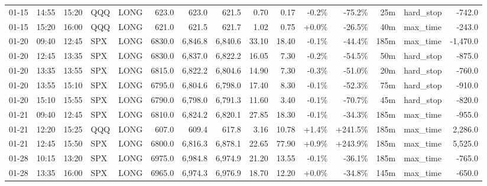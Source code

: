 \documentclass[11pt,a4paper,twoside]{article}
\begin{document}
\begin{landscape}
\begin{center}
\begin{longtable}{>{\color{txtmain}}l l l l l r r r r r r r r >{\color{txtmain}}l r}
01-15 & 14:55 & 15:20 & QQQ & LONG & 623.0 & 623.0 & 621.5 & 0.70 & 0.17 & \textcolor{lossred}{-0.2\%} & \textcolor{lossred}{-75.2\%} & 25m & hard\_stop & \textcolor{lossred}{-742.0} \\
01-15 & 15:20 & 16:00 & QQQ & LONG & 621.0 & 621.5 & 621.7 & 1.02 & 0.75 & \textcolor{wingreen}{+0.0\%} & \textcolor{lossred}{-26.5\%} & 40m & max\_time & \textcolor{lossred}{-243.0} \\
01-20 & 09:40 & 12:45 & SPX & LONG & 6830.0 & 6,846.8 & 6,840.6 & 33.10 & 18.40 & \textcolor{lossred}{-0.1\%} & \textcolor{lossred}{-44.4\%} & 185m & max\_time & \textcolor{lossred}{-1,470.0} \\
01-20 & 12:45 & 13:35 & SPX & LONG & 6830.0 & 6,837.0 & 6,822.2 & 16.05 & 7.30 & \textcolor{lossred}{-0.2\%} & \textcolor{lossred}{-54.5\%} & 50m & hard\_stop & \textcolor{lossred}{-875.0} \\
01-20 & 13:35 & 13:55 & SPX & LONG & 6815.0 & 6,822.2 & 6,804.6 & 14.90 & 7.30 & \textcolor{lossred}{-0.3\%} & \textcolor{lossred}{-51.0\%} & 20m & hard\_stop & \textcolor{lossred}{-760.0} \\
01-20 & 13:55 & 15:10 & SPX & LONG & 6795.0 & 6,804.6 & 6,798.0 & 17.40 & 8.30 & \textcolor{lossred}{-0.1\%} & \textcolor{lossred}{-52.3\%} & 75m & hard\_stop & \textcolor{lossred}{-910.0} \\
01-20 & 15:10 & 15:55 & SPX & LONG & 6790.0 & 6,798.0 & 6,791.3 & 11.60 & 3.40 & \textcolor{lossred}{-0.1\%} & \textcolor{lossred}{-70.7\%} & 45m & hard\_stop & \textcolor{lossred}{-820.0} \\
01-21 & 09:40 & 12:45 & SPX & LONG & 6810.0 & 6,824.2 & 6,820.1 & 27.85 & 18.30 & \textcolor{lossred}{-0.1\%} & \textcolor{lossred}{-34.3\%} & 185m & max\_time & \textcolor{lossred}{-955.0} \\
01-21 & 12:20 & 15:25 & QQQ & LONG & 607.0 & 609.4 & 617.8 & 3.16 & 10.78 & \textcolor{wingreen}{+1.4\%} & \textcolor{wingreen}{+241.5\%} & 185m & max\_time & \textcolor{wingreen}{2,286.0} \\
01-21 & 12:45 & 15:50 & SPX & LONG & 6800.0 & 6,816.3 & 6,878.1 & 22.65 & 77.90 & \textcolor{wingreen}{+0.9\%} & \textcolor{wingreen}{+243.9\%} & 185m & max\_time & \textcolor{wingreen}{5,525.0} \\
01-28 & 10:15 & 13:20 & SPX & LONG & 6975.0 & 6,984.8 & 6,974.9 & 21.20 & 13.55 & \textcolor{lossred}{-0.1\%} & \textcolor{lossred}{-36.1\%} & 185m & max\_time & \textcolor{lossred}{-765.0} \\
01-28 & 13:35 & 16:00 & SPX & LONG & 6965.0 & 6,974.3 & 6,976.9 & 18.70 & 12.20 & \textcolor{wingreen}{+0.0\%} & \textcolor{lossred}{-34.8\%} & 145m & max\_time & \textcolor{lossred}{-650.0} \\

\end{longtable}
\end{center}
\end{landscape}
\end{document}

